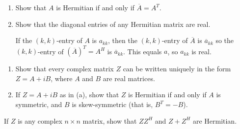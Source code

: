 \documentclass{ximera}
\begin{document}
\begin{problem}\label{prb:complex_matrices11}
\begin{enumerate}[label={\alph*.}]
\item Show that $A$ is Hermitian if and only if $\overline{A} = A^T$.

\item Show that the diagonal entries of any Hermitian matrix are real.

\begin{hint}
If the $(k, k)$-entry of $A$ is $a_{kk}$, then the $(k, k)$-entry of $\overline{A}$ is $\overline{a}_{kk}$ so the $(k, k)$-entry of $(\overline{A})^T = A^{H}$ is $\overline{a}_{kk}$. This equals $a$, so $a_{kk}$ is real.
\end{hint}
\end{enumerate}
\end{problem}

\begin{problem}\label{prb:complex_matrices12}
\begin{enumerate}
\item Show that every complex matrix $Z$ can be written uniquely in the form $Z = A + iB$, where $A$ and $B$ are real matrices.

\item If $Z = A + iB$ as in (a), show that $Z$ is Hermitian if and only if $A$ is symmetric, and $B$ is skew-symmetric (that is, $B^{T} = -B$).

\end{enumerate}
\end{problem}

\begin{problem}\label{prb:complex_matrices13}
If $Z$ is any complex $n \times n$ matrix, show that $ZZ^{H}$ and $Z + Z^{H}$ are Hermitian.
\end{problem}
\end{document}
